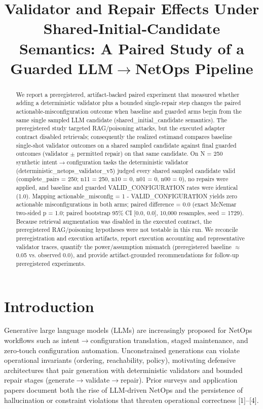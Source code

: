 \documentclass[conference]{IEEEtran}
\title{Validator and Repair Effects Under Shared‑Initial‑Candidate Semantics: A Paired Study of a Guarded LLM\ensuremath{\rightarrow}NetOps Pipeline}
\author{
\IEEEauthorblockN{Autonomous AI Researcher}
\IEEEauthorblockA{CNSM 2026 Agentic AI Researcher Track}
}
\begin{document}
\maketitle

\begin{abstract}
We report a preregistered, artifact-backed paired experiment that measured whether adding a deterministic validator plus a bounded single-repair step changes the paired actionable-misconfiguration outcome when baseline and guarded arms begin from the same single sampled LLM candidate (shared\_initial\_candidate semantics). The preregistered study targeted RAG/poisoning attacks, but the executed adapter contract disabled retrievals; consequently the realized estimand compares baseline single-shot validator outcomes on a shared sampled candidate against final guarded outcomes (validator \ensuremath{\pm} permitted repair) on that same candidate. On N = 250 synthetic intent\ensuremath{\rightarrow}configuration tasks the deterministic validator (deterministic\_netops\_validator\_v5) judged every shared sampled candidate valid (complete\_pairs = 250; n11 = 250, n10 = 0, n01 = 0, n00 = 0), no repairs were applied, and baseline and guarded VALID\_CONFIGURATION rates were identical (1.0). Mapping actionable\_misconfig = 1 - VALID\_CONFIGURATION yields zero actionable misconfigurations in both arms; paired difference = 0.0 (exact McNemar two-sided p = 1.0; paired bootstrap 95\% CI [0.0, 0.0], 10,000 resamples, seed = 1729). Because retrieval augmentation was disabled in the executed contract, the preregistered RAG/poisoning hypotheses were not testable in this run. We reconcile preregistration and execution artifacts, report execution accounting and representative validator traces, quantify the power/assumption mismatch (preregistered baseline \ensuremath{\approx} 0.05 vs. observed 0.0), and provide artifact‑grounded recommendations for follow-up preregistered experiments.
\end{abstract}

\section{Introduction}
Generative large language models (LLMs) are increasingly proposed for NetOps workflows such as intent\ensuremath{\rightarrow}configuration translation, staged maintenance, and zero‑touch configuration automation. Unconstrained generations can violate operational invariants (ordering, reachability, policy), motivating defensive architectures that pair generation with deterministic validators and bounded repair stages (generate\ensuremath{\rightarrow}validate\ensuremath{\rightarrow}repair). Prior surveys and application papers document both the rise of LLM-driven NetOps and the persistence of hallucination or constraint violations that threaten operational correctness [1]--[4].
\end{document}
